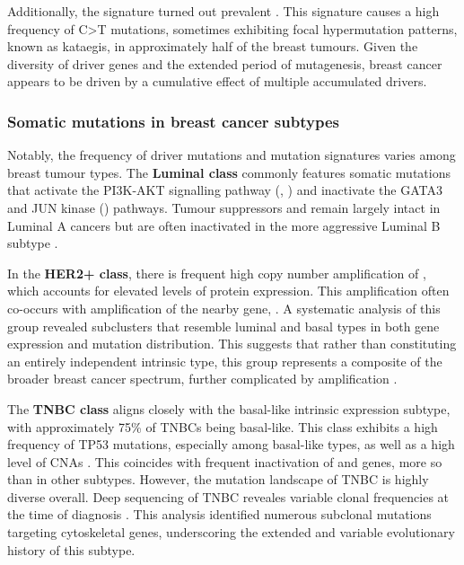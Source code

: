 Additionally, the  signature turned out prevalent \parencite{Nik-Zainal2016-ek, Banerji2012-as, Nik-Zainal2012-vo}. This signature causes a high frequency of C>T mutations, sometimes exhibiting focal hypermutation patterns, known as kataegis, in approximately half of the breast tumours. Given the diversity of driver genes and the extended period of mutagenesis, breast cancer appears to be driven by a cumulative effect of multiple accumulated drivers.


\subsubsection*{Somatic mutations in breast cancer subtypes}

Notably, the frequency of driver mutations and mutation signatures varies among breast tumour types. The \textbf{Luminal class} commonly features somatic mutations that activate the PI3K-AKT signalling pathway (, ) and inactivate the GATA3 and JUN kinase () pathways. Tumour suppressors  and  remain largely intact in Luminal A cancers but are often inactivated in the more aggressive Luminal B subtype \parencite{Cancer_Genome_Atlas_Network2012-gx}.

In the \textbf{HER2+ class}, there is frequent high copy number amplification of , which accounts for elevated levels of  protein expression. This amplification often co-occurs with amplification of the nearby gene, . A systematic analysis of this group revealed subclusters that resemble luminal and basal types in both gene expression and mutation distribution. This suggests that rather than constituting an entirely independent intrinsic type, this group represents a composite of the broader breast cancer spectrum, further complicated by  amplification \parencite{Ferrari2016-qj}.

The \textbf{\ac{TNBC} class} aligns closely with the basal-like intrinsic expression subtype, with approximately 75\% of \ac{TNBC}s being basal-like. This class exhibits a high frequency of TP53 mutations, especially among basal-like types, as well as a high level of \ac{CNA}s \parencite{Shah2012-xz, Cancer_Genome_Atlas_Network2012-gx}. This coincides with frequent inactivation of  and  genes, more so than in other subtypes. However, the mutation landscape of \ac{TNBC} is highly diverse overall. Deep sequencing of \ac{TNBC} reveales variable clonal frequencies at the time of diagnosis \parencite{Shah2012-xz}. This analysis identified numerous subclonal mutations targeting cytoskeletal genes, underscoring the extended and variable evolutionary history of this subtype.


